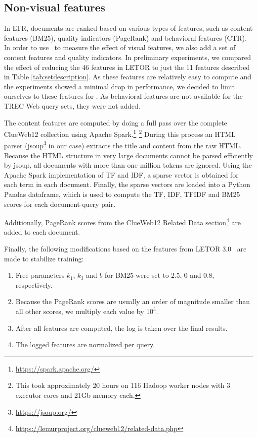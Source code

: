 \subsection{Non-visual features} 
\label{sec:contentfeature}
In LTR, documents are ranked based on various types of features, such as content features (BM25), quality indicators (PageRank) and behavioral features (CTR).
In order to use \datasetname~to measure the effect of visual features, we also add a set of content features and quality indicators. In preliminary experiments, we compared the effect of reducing the 46 features in LETOR \cite{qin2010letor} to just the 11 features described in Table \ref{tab:setdescription}. As these features are relatively easy to compute and the experiments showed a minimal drop in performance, we decided to limit ourselves to these features for \datasetname. As behavioral features are not available for the TREC Web query sets, they were not  added.

The content features are computed by doing a full pass over the complete ClueWeb12 collection using Apache Spark.\footnote{\url{https://spark.apache.org/}}
$^{ }$\footnote{This took approximately 20 hours on 116 Hadoop worker nodes with 3 executor cores and 21Gb memory each.}
\fi
During this process an HTML parser (jsoup\footnote{\url{https://jsoup.org/}} in our case) extracts the title and content from the raw HTML.
Because the HTML structure in very large documents cannot be parsed efficiently by jsoup, all documents with more than one million tokens are ignored.
Using the Apache Spark implementation of TF and IDF, a sparse vector is obtained for each term in each document. Finally, the sparse vectors are loaded into a Python Pandas dataframe, which is used to compute the TF, IDF, TFIDF and BM25 scores for each document-query pair.

Additionally, PageRank scores from the ClueWeb12 Related Data section\footnote{\url{https://lemurproject.org/clueweb12/related-data.php}} are added to each document.

Finally, the following modifications based on the features from LETOR 3.0~\cite{qin2010letor} are made to stabilize training:
\begin{enumerate}[nosep,leftmargin=14pt]
\item Free parameters $k_1$, $k_3$ and $b$ for BM25 were set to $2.5$, $0$ and $0.8$, respectively. 
\item Because the PageRank scores are usually an order of magnitude smaller than all other scores, we multiply each value by $10^5$.
\item After all features are computed, the log is taken over the final results.
\item The logged features are normalized per query.  
\end{enumerate}

